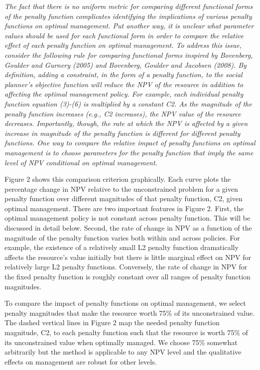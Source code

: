 \documentclass[authoryear, review, 12pt]{elsarticle}
\newcommand{\jr}[1]{{\it \color{darkred} #1}}
\begin{document}
\jr{
The fact that there is no uniform metric for comparing different functional forms of the penalty function complicates identifying the implications of various penalty functions on optimal management.  Put another way, it is unclear what parameter values should be used for each functional form in order to compare the relative effect of each penalty function on optimal management.  
To address this issue, consider the following rule for comparing functional forms inspired by Bovenberg, Goulder and Gurnery (2005) and Bovenberg, Goulder and Jacobsen (2008).  By definition, adding a constraint, in the form of a penalty function, to the social planner’s objective function will reduce the NPV of the resource in addition to affecting the optimal management policy.  For example, each individual penalty function equation (3)-(6) is multiplied by a constant C2.  As the magnitude of the penalty function increases (e.g., C2 increases), the NPV value of the resource decreases.  Importantly, though, the rate at which the NPV is affected by a given increase in magnitude of the penalty function is different for different penalty functions.  One way to compare the relative impact of penalty functions on optimal management is to choose parameters for the penalty function that imply the same level of NPV conditional on optimal management. 

Figure 2 shows this comparison criterion graphically.  Each curve plots the percentage change in NPV relative to the unconstrained problem for a given penalty function over different magnitudes of that penalty function, C2, given optimal management.  There are two important features in Figure 2.  First, the optimal management policy is not constant across penalty function.  This will be discussed in detail below.  Second, the rate of change in NPV as a function of the magnitude of the penalty function varies both within and across policies.  For example, the existence of a relatively small L2 penalty function dramatically affects the resource’s value initially but there is little marginal effect on NPV for relatively large L2 penalty functions.  Conversely, the rate of change in NPV for the fixed penalty function is roughly constant over all ranges of penalty function magnitudes.  

To compare the impact of penalty functions on optimal management, we select penalty magnitudes that make the resource worth 75\% of its unconstrained value.   The dashed vertical lines in Figure 2 map the needed penalty function magnitude, C2, to each penalty function such that the resource is worth 75\% of its unconstrained value when optimally managed.  We choose 75\% somewhat arbitrarily but the method is applicable to any NPV level and the qualitative effects on management are robust for other levels.  

}
\end{document}
